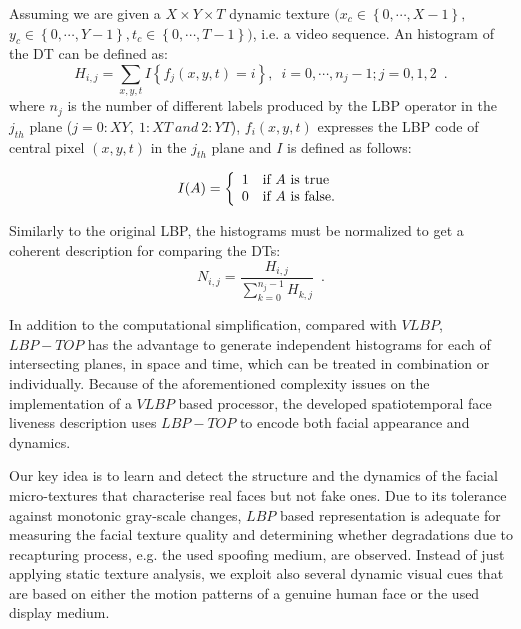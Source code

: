 Assuming we are given a $X\times Y \times T$ dynamic texture $(x_c \in \left\{0,\cdots,X-1\right\},$ $y_c \in\left\{0,\cdots,Y-1\right\}, t_c\in\left\{0,\cdots,T-1\right\})$, i.e. a video sequence. An histogram of the DT can be defined as: 
\begin{equation}
H_{i,j}=\sum_{x,y,t}I\left\{f_{j}(x,y,t)=i\right\},\enspace i=0,\cdots,n_j-1;j=0,1,2 \enspace.
\end{equation}
where $n_j$ is the number of different labels produced by the LBP operator in the $j_{th}$ plane ($j=0: XY,~1: XT~and~2: YT$), $f_i(x,y,t)$ expresses the LBP code of central pixel $(x,y,t)$ in the $j_{th}$ plane and $I$ is defined as follows:

\begin{equation}
I(A) = \left\{ 
  \begin{array}{l l}
    1 &  \textrm{if $A$ is true}\\
    0 &  \textrm{if $A$ is false.}\\
  \end{array} \right.
\end{equation}


Similarly to the original LBP, the histograms must be normalized to get a coherent description for comparing the DTs:
\begin{equation}
N_{i,j}=\frac{H_{i,j}}{\sum_{k=0}^{n_j-1}H_{k,j}} \enspace .
\end{equation}

In addition to the computational simplification, compared with $VLBP$, $LBP-TOP$ has the advantage to generate independent histograms for each of intersecting planes, in space and time, which can be treated in combination or individually. Because of the aforementioned complexity issues on the implementation of a $VLBP$ based processor, the developed spatiotemporal face liveness description uses $LBP-TOP$ to encode both facial appearance and dynamics. 

Our key idea is to learn and detect the structure and the dynamics of the facial micro-textures that characterise real faces but not fake ones. Due to its tolerance against monotonic gray-scale changes, $LBP$ based representation is adequate for measuring the facial texture quality and determining whether degradations due to recapturing process, e.g. the used spoofing medium, are observed. Instead of just applying static texture analysis, we exploit also several dynamic visual cues that are based on either the motion patterns of a genuine human face or the used display medium.


